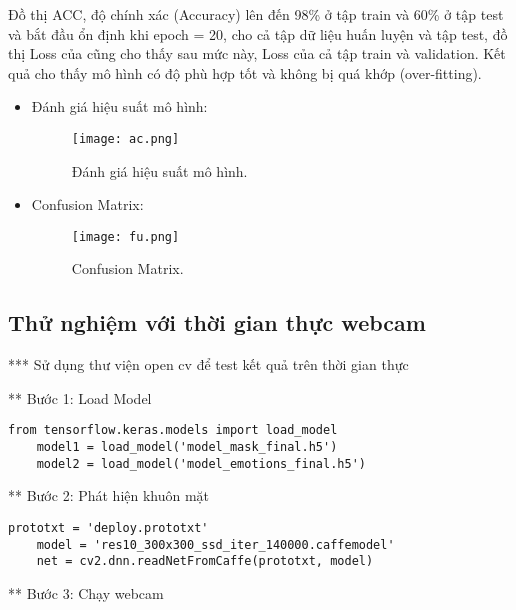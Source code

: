 Đồ thị ACC,  độ chính xác (Accuracy) lên đến 98\% ở tập train và 60\% ở tập test và bắt đầu ổn định khi epoch = 20,  cho cả tập dữ liệu huấn luyện và tập test, đồ thị Loss của cũng cho thấy sau mức này, Loss của cả tập train và validation. Kết quả cho thấy mô hình có độ phù hợp tốt và không bị quá khớp (over-fitting).

\begin{itemize}
	\item Đánh giá hiệu suất mô hình:
	
	\begin{figure}[h!]
		\centering
		\texttt{[image: ac.png]}
		\caption[Đánh giá hiệu suất mô hình.]{Đánh giá hiệu suất mô hình.}
		\label{fig:ac} 
	\end{figure}
	
	\item Confusion Matrix:
	
	\begin{figure}[h!]
		\centering
		\texttt{[image: fu.png]}
		\caption[Confusion Matrix.]{Confusion Matrix.}
		\label{fig:fu} 
	\end{figure}
\end{itemize}

\subsection{Thử nghiệm với thời gian thực webcam}

*** Sử dụng thư viện open cv để test kết quả trên thời gian thực 

** Bước 1: Load Model

\begin{lstlisting}[style=codePython]
	from tensorflow.keras.models import load_model
	model1 = load_model('model_mask_final.h5')
	model2 = load_model('model_emotions_final.h5')					
\end{lstlisting}

** Bước 2: Phát hiện khuôn mặt

\begin{lstlisting}[style=codePython]
	prototxt = 'deploy.prototxt'
	model = 'res10_300x300_ssd_iter_140000.caffemodel'
	net = cv2.dnn.readNetFromCaffe(prototxt, model)						
\end{lstlisting}

** Bước 3: Chạy webcam

